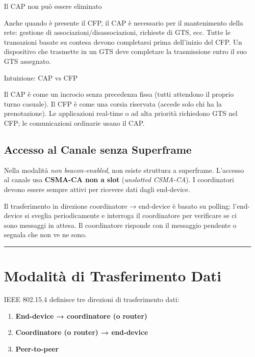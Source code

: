 \documentclass[
  italian,
  openany]{book}
\providecommand{\tightlist}{%
  \setlength{\itemsep}{0pt}\setlength{\parskip}{0pt}}
\begin{document}
\begin{calloutwarning}{Il CAP non può essere eliminato}

Anche quando è presente il CFP, il CAP è necessario per il mantenimento
della rete: gestione di associazioni/disassociazioni, richieste di GTS,
ecc. Tutte le transazioni basate su contesa devono completarsi prima
dell'inizio del CFP. Un dispositivo che trasmette in un GTS deve
completare la trasmissione entro il suo GTS assegnato.

\end{calloutwarning}

\begin{callouttip}{Intuizione: CAP vs CFP}

Il CAP è come un incrocio senza precedenza fissa (tutti attendono il
proprio turno casuale). Il CFP è come una corsia riservata (accede solo
chi ha la prenotazione). Le applicazioni real-time o ad alta priorità
richiedono GTS nel CFP; le comunicazioni ordinarie usano il CAP.

\end{callouttip}

\subsection{Accesso al Canale senza
Superframe}\label{accesso-al-canale-senza-superframe}

Nella modalità \emph{non beacon-enabled}, non esiste struttura a
superframe. L'accesso al canale usa \textbf{CSMA-CA non a slot}
(\emph{unslotted CSMA-CA}). I coordinatori devono essere sempre attivi
per ricevere dati dagli end-device.

Il trasferimento in direzione coordinatore → end-device è basato su
polling: l'end-device si sveglia periodicamente e interroga il
coordinatore per verificare se ci sono messaggi in attesa. Il
coordinatore risponde con il messaggio pendente o segnala che non ve ne
sono.

\begin{center}\rule{0.5\linewidth}{0.5pt}\end{center}

\section{Modalità di Trasferimento
Dati}\label{modalituxe0-di-trasferimento-dati}

IEEE 802.15.4 definisce tre direzioni di trasferimento dati:

\begin{enumerate}
\def\labelenumi{\arabic{enumi}.}
\tightlist
\item
  \textbf{End-device → coordinatore (o router)}
\item
  \textbf{Coordinatore (o router) → end-device}
\item
  \textbf{Peer-to-peer}
\end{enumerate}
\end{document}
